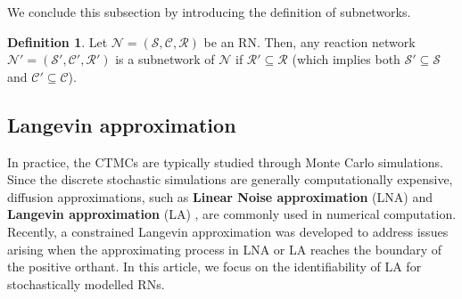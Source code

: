 \documentclass[10pt,a4paper]{amsart}
\theoremstyle{definition}
\newtheorem{definition}[theorem]{Definition}
\theoremstyle{remark}
\theoremstyle{consequence}
\def\cC{\mathcal{C}}
\numberwithin{equation}{section}
\begin{document}
We conclude this subsection by introducing the definition of subnetworks.
\begin{definition} \cite{fontanil2021common}
    Let $\mathcal{N}=(\mathcal{S},\mathcal{C},\mathcal{R})$ be an RN. Then, any reaction network $\mathcal{N}'=(\mathcal{S}',\mathcal{C}',\mathcal{R}')$ is a subnetwork of $\mathcal{N}$ if $\mathcal{R}' \subseteq \mathcal{R}$ ({which implies both $\mathcal{S}' \subseteq \mathcal{S}$ and $\cC' \subseteq \cC$}).
\end{definition}

\subsection{Langevin approximation}

In practice, the CTMCs are typically studied through Monte Carlo simulations. Since the discrete stochastic simulations are generally computationally expensive, diffusion approximations, such as \textbf{Linear Noise approximation} (LNA) \cite{vankampen1} and \textbf{Langevin approximation} (LA) \cite{Kurtz1976,KURTZ1978}, are commonly used in numerical computation. Recently, a  constrained Langevin approximation \cite{anderson2019constrained,leite2019} was developed to address issues arising when the approximating process in LNA or LA reaches the boundary of the positive orthant. In this article, we focus on the identifiability of LA for stochastically modelled  RNs.
\end{document}
